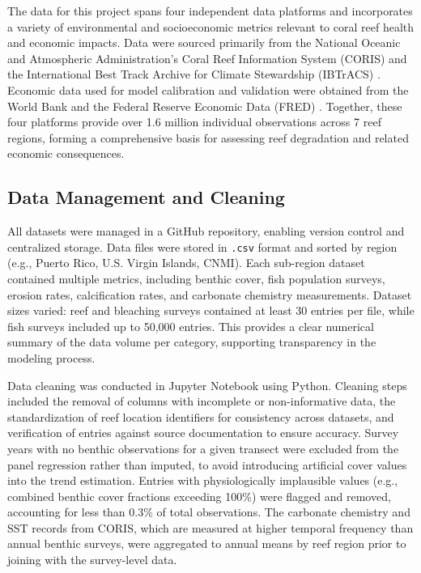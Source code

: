 \documentclass[10pt,letterpaper]{article}
\newcounter{metric}
\begin{document}
The data for this project spans four independent data platforms and incorporates a variety of environmental and socioeconomic metrics relevant to coral reef health and economic impacts. Data were sourced primarily from the National Oceanic and Atmospheric Administration's Coral Reef Information System (CORIS) and the International Best Track Archive for Climate Stewardship (IBTrACS) \cite{noaa_coris, ibtracs}. Economic data used for model calibration and validation were obtained from the World Bank and the Federal Reserve Economic Data (FRED) \cite{world_bank, fred}. Together, these four platforms provide over 1.6 million individual observations across 7 reef regions, forming a comprehensive basis for assessing reef degradation and related economic consequences.

\subsection{Data Management and Cleaning}

All datasets were managed in a GitHub repository, enabling version control and centralized storage. Data files were stored in \texttt{.csv} format and sorted by region (e.g., Puerto Rico, U.S. Virgin Islands, CNMI). Each sub-region dataset contained multiple metrics, including benthic cover, fish population surveys, erosion rates, calcification rates, and carbonate chemistry measurements. Dataset sizes varied: reef and bleaching surveys contained at least 30 entries per file, while fish surveys included up to 50,000 entries. This provides a clear numerical summary of the data volume per category, supporting transparency in the modeling process.

Data cleaning was conducted in Jupyter Notebook using Python. Cleaning steps included the removal of columns with incomplete or non-informative data, the standardization of reef location identifiers for consistency across datasets, and verification of entries against source documentation to ensure accuracy. Survey years with no benthic observations for a given transect were excluded from the panel regression rather than imputed, to avoid introducing artificial cover values into the trend estimation. Entries with physiologically implausible values (e.g., combined benthic cover fractions exceeding 100\%) were flagged and removed, accounting for less than 0.3\% of total observations. The carbonate chemistry and SST records from CORIS, which are measured at higher temporal frequency than annual benthic surveys, were aggregated to annual means by reef region prior to joining with the survey-level data.
\end{document}

